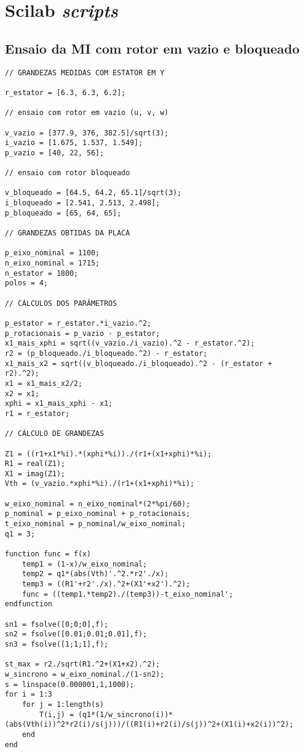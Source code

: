 \appendix

\section{Scilab \textit{scripts}}

\subsection{Ensaio da MI com rotor em vazio e bloqueado}

\begin{lstlisting}
// GRANDEZAS MEDIDAS COM ESTATOR EM Y

r_estator = [6.3, 6.3, 6.2]; 

// ensaio com rotor em vazio (u, v, w)

v_vazio = [377.9, 376, 382.5]/sqrt(3); 
i_vazio = [1.675, 1.537, 1.549];
p_vazio = [40, 22, 56];

// ensaio com rotor bloqueado

v_bloqueado = [64.5, 64.2, 65.1]/sqrt(3); 
i_bloqueado = [2.541, 2.513, 2.498];
p_bloqueado = [65, 64, 65];

// GRANDEZAS OBTIDAS DA PLACA

p_eixo_nominal = 1100;
n_eixo_nominal = 1715;
n_estator = 1800;
polos = 4;

// CÁLCULOS DOS PARÂMETROS

p_estator = r_estator.*i_vazio.^2;
p_rotacionais = p_vazio - p_estator;
x1_mais_xphi = sqrt((v_vazio./i_vazio).^2 - r_estator.^2);
r2 = (p_bloqueado./i_bloqueado.^2) - r_estator;
x1_mais_x2 = sqrt((v_bloqueado./i_bloqueado).^2 - (r_estator + r2).^2);
x1 = x1_mais_x2/2;
x2 = x1;
xphi = x1_mais_xphi - x1;
r1 = r_estator;

// CÁLCULO DE GRANDEZAS

Z1 = ((r1+x1*%i).*(xphi*%i))./(r1+(x1+xphi)*%i);
R1 = real(Z1);
X1 = imag(Z1);
Vth = (v_vazio.*xphi*%i)./(r1+(x1+xphi)*%i);

w_eixo_nominal = n_eixo_nominal*(2*%pi/60);
p_nominal = p_eixo_nominal + p_rotacionais;
t_eixo_nominal = p_nominal/w_eixo_nominal;
q1 = 3;

function func = f(x)
    temp1 = (1-x)/w_eixo_nominal;
    temp2 = q1*(abs(Vth)'.^2.*r2'./x);
    temp3 = ((R1'+r2'./x).^2+(X1'+x2').^2);
    func = ((temp1.*temp2)./(temp3))-t_eixo_nominal';
endfunction

sn1 = fsolve([0;0;0],f);
sn2 = fsolve([0.01;0.01;0.01],f);
sn3 = fsolve([1;1;1],f);

st_max = r2./sqrt(R1.^2+(X1+x2).^2);
w_sincrono = w_eixo_nominal./(1-sn2);
s = linspace(0.000001,1,1000);
for i = 1:3
    for j = 1:length(s)
        T(i,j) = (q1*(1/w_sincrono(i))*(abs(Vth(i))^2*r2(i)/s(j)))/((R1(i)+r2(i)/s(j))^2+(X1(i)+x2(i))^2);
    end
end


\end{lstlisting}
